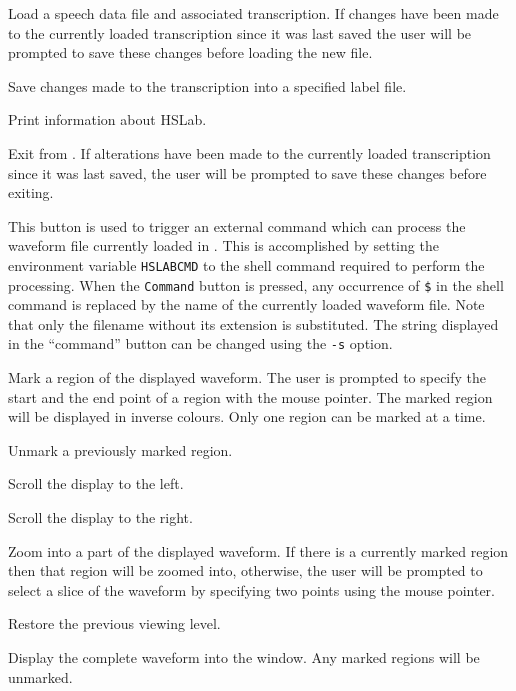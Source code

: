 \begin{optlist}
   Load a speech data file and associated transcription.
      If changes have been made to the currently loaded transcription 
      since it was last saved the user will be prompted to save these 
      changes before loading the new file.

   Save changes made to the transcription into a specified
      label file.

   Print information about HSLab.

   Exit from . If alterations have been made 
      to the currently loaded transcription since it was last saved, the user 
      will be prompted to save these changes before exiting.

   This button is used to trigger an external command which 
      can process the waveform file currently loaded in . This 
      is accomplished by setting the environment variable \texttt{HSLABCMD} to the 
      shell command required to perform the processing. When the \texttt{Command}
      button is pressed, any occurrence of \texttt{\$} in the shell command is 
      replaced by the name of the currently loaded waveform file. Note that 
      only the filename without its extension is substituted. The string 
      displayed in the ``command'' button can be changed using the \texttt{-s} 
      option.

   Mark a region of the displayed waveform. The user 
      is prompted to specify the start and the end point of a region with
      the mouse pointer. The marked region will be displayed in inverse 
      colours. Only one region can be marked at a time.

   Unmark a previously marked region.

  \ttitem{\hbbut{<--}} Scroll the display to the left.

  \ttitem{\hbbut{-->}} Scroll the display to the right.

   Zoom into a part of the displayed waveform. If there is 
      a currently marked region then that region will be zoomed into, 
      otherwise, the user will be prompted to select a slice of the 
      waveform by specifying two points using the mouse pointer.

   Restore the previous viewing level.  

   Display the complete waveform into the window. Any 
      marked regions will be unmarked.  


\end{optlist}
